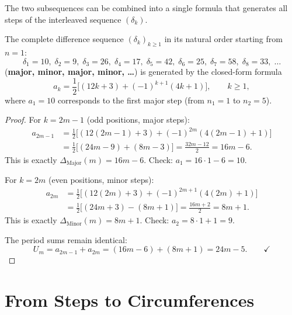 The two subsequences can be combined into a single formula
that generates all steps of the interleaved sequence $(\delta_k)$.

\begin{theorem}
The complete difference sequence $(\delta_k)_{k \geq 1}$ in its natural
order starting from $n = 1$:
\[
  \delta_1 = 10,\; \delta_2 = 9,\; \delta_3 = 26,\; \delta_4 = 17,\;
  \delta_5 = 42,\; \delta_6 = 25,\; \delta_7 = 58,\; \delta_8 = 33,\; \ldots
\]
(\textbf{major, minor, major, minor, \ldots}) is generated by the closed-form
formula
\begin{equation}
  a_k = \frac{1}{2}\bigl[(12k+3) + (-1)^{k+1}(4k+1)\bigr],
  \qquad k \geq 1,
\end{equation}
where $a_1 = 10$ corresponds to the first major step (from $n_1 = 1$ to
$n_2 = 5$).
\end{theorem}

\begin{proof}
For $k = 2m-1$ (odd positions, major steps):
\begin{align*}
  a_{2m-1}
  &= \frac{1}{2}\bigl[(12(2m-1)+3) + (-1)^{2m}(4(2m-1)+1)\bigr] \\
  &= \frac{1}{2}\bigl[(24m-9) + (8m-3)\bigr]
  = \frac{32m-12}{2} = 16m-6.
\end{align*}
This is exactly $\Delta_{\mathrm{Major}}(m) = 16m-6$. \quad
Check: $a_1 = 16\cdot1-6 = 10$. \checkmark

For $k = 2m$ (even positions, minor steps):
\begin{align*}
  a_{2m}
  &= \frac{1}{2}\bigl[(12(2m)+3) + (-1)^{2m+1}(4(2m)+1)\bigr] \\
  &= \frac{1}{2}\bigl[(24m+3) - (8m+1)\bigr]
  = \frac{16m+2}{2} = 8m+1.
\end{align*}
This is exactly $\Delta_{\mathrm{Minor}}(m) = 8m+1$. \quad
Check: $a_2 = 8\cdot1+1 = 9$. \checkmark

The period sums remain identical:
\[
  U_m = a_{2m-1} + a_{2m}
      = (16m-6) + (8m+1)
      = 24m - 5. \qquad\checkmark
\]
\end{proof}

\section{From Steps to Circumferences}

